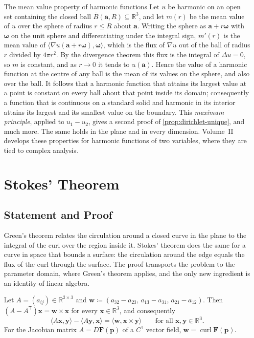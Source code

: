 \begin{note}{The mean value property of harmonic functions}
Let $u$ be harmonic on an open set containing the closed ball $\bar B(\mathbf a,R)\subseteq\mathbb R^3$, and let $m(r)$ be the mean value of $u$ over the sphere of radius $r\le R$ about $\mathbf a$. Writing the sphere as $\mathbf a+r\boldsymbol\omega$ with $\boldsymbol\omega$ on the unit sphere and differentiating under the integral sign, $m'(r)$ is the mean value of $\langle\nabla u(\mathbf a+r\boldsymbol\omega),\boldsymbol\omega\rangle$, which is the flux of $\nabla u$ out of the ball of radius $r$ divided by $4\pi r^2$. By the divergence theorem this flux is the integral of $\Delta u=0$, so $m$ is constant, and as $r\to0$ it tends to $u(\mathbf a)$. Hence the value of a harmonic function at the centre of any ball is the mean of its values on the sphere, and also over the ball. It follows that a harmonic function that attains its largest value at a point is constant on every ball about that point inside its domain; consequently a function that is continuous on a standard solid and harmonic in its interior attains its largest and its smallest value on the boundary. This \emph{maximum principle}, applied to $u_1-u_2$, gives a second proof of \cref{prop:dirichlet-unique}, and much more. The same holds in the plane and in every dimension. Volume~II develops these properties for harmonic functions of two variables, where they are tied to complex analysis.
\end{note}

\section{Stokes' Theorem}
\label{sec:stokes}

\subsection{Statement and Proof}

Green's theorem relates the circulation around a closed curve in the plane to the integral of the curl over the region inside it. Stokes' theorem does the same for a curve in space that bounds a surface: the circulation around the edge equals the flux of the curl through the surface. The proof transports the problem to the parameter domain, where Green's theorem applies, and the only new ingredient is an identity of linear algebra.

\begin{lemma}
\label{lem:antisymmetric-curl}
Let $A=(a_{ij})\in\mathbb R^{3\times3}$ and $\mathbf w\coloneqq(a_{32}-a_{23},\,a_{13}-a_{31},\,a_{21}-a_{12})$. Then $(A-A^{\mathsf T})\mathbf x=\mathbf w\times\mathbf x$ for every $\mathbf x\in\mathbb R^3$, and consequently
\[
\langle A\mathbf x,\mathbf y\rangle-\langle A\mathbf y,\mathbf x\rangle=\langle\mathbf w,\mathbf x\times\mathbf y\rangle\qquad\text{for all }\mathbf x,\mathbf y\in\mathbb R^3 .
\]
For the Jacobian matrix $A=D\mathbf F(\mathbf p)$ of a $C^1$ vector field, $\mathbf w=\operatorname{curl}\mathbf F(\mathbf p)$.
\end{lemma}

